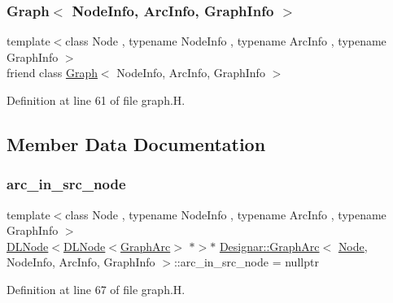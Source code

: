 \subsubsection{\texorpdfstring{Graph$<$ Node\+Info, Arc\+Info, Graph\+Info $>$}{Graph< NodeInfo, ArcInfo, GraphInfo >}}
{\footnotesize\ttfamily template$<$class Node , typename Node\+Info , typename Arc\+Info , typename Graph\+Info $>$ \\
friend class \hyperlink{class_designar_1_1_graph}{Graph}$<$ Node\+Info, Arc\+Info, Graph\+Info $>$\hspace{0.3cm}{\ttfamily [friend]}}



Definition at line 61 of file graph.\+H.



\subsection{Member Data Documentation}
\mbox{\label{class_designar_1_1_graph_arc_addbd9ebec2787d3950aa679acf392fc6}} 
\subsubsection{\texorpdfstring{arc\+\_\+in\+\_\+src\+\_\+node}{arc\_in\_src\_node}}
{\footnotesize\ttfamily template$<$class Node , typename Node\+Info , typename Arc\+Info , typename Graph\+Info $>$ \\
\hyperlink{class_designar_1_1_d_l_node}{D\+L\+Node}$<$\hyperlink{class_designar_1_1_d_l_node}{D\+L\+Node}$<$\hyperlink{class_designar_1_1_graph_arc}{Graph\+Arc}$>$ $\ast$$>$$\ast$ \hyperlink{class_designar_1_1_graph_arc}{Designar\+::\+Graph\+Arc}$<$ \hyperlink{namespace_designar_a5af326c65aa2bd26b26c410f2030d09e}{Node}, Node\+Info, Arc\+Info, Graph\+Info $>$\+::arc\+\_\+in\+\_\+src\+\_\+node = nullptr\hspace{0.3cm}{\ttfamily [protected]}}



Definition at line 67 of file graph.\+H.

\mbox{\label{class_designar_1_1_graph_arc_a49385be5572e3c6dd2d22309ef5fd79a}} 

